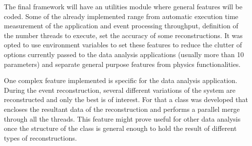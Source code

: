 The final framework will have an utilities module where general features will be coded. Some of the already implemented range from automatic execution time measurement of the application and event processing throughput, definition of the number threads to execute, set the accuracy of some reconstructions. It was opted to use environment variables to set these features to reduce the clutter of options currently passed to the data analysis applications (usually more than 10 parameters) and separate general purpose features from physics functionalities.

One complex feature implemented is specific for the \ttH data analysis application. During the event reconstruction, several different variations of the system are reconstructed and only the best is of interest. For that a class was developed that encloses the resultant data of the reconstruction and performs a parallel merge through all the threads. This feature might prove useful for other data analysis once the structure of the class is general enough to hold the result of different types of reconstructions.

